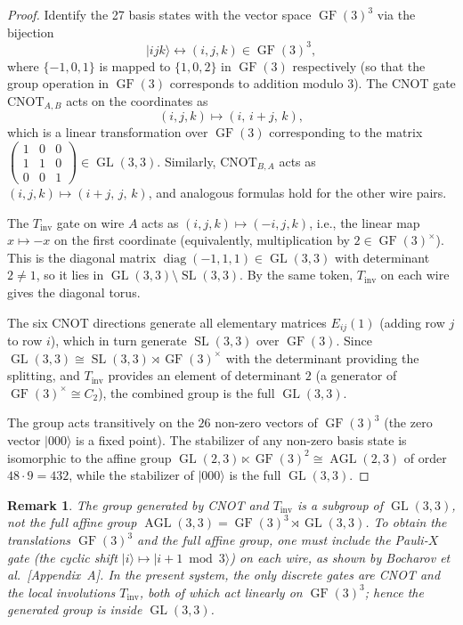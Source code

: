 \documentclass[12pt,a4paper]{article}
\newtheorem{remark}[theorem]{Remark}
\newcommand{\GL}{\operatorname{GL}}
\newcommand{\AGL}{\operatorname{AGL}}
\newcommand{\SL}{\operatorname{SL}}
\newcommand{\GF}{\operatorname{GF}}
\begin{document}
\begin{proof}
Identify the 27 basis states with the vector space $\GF(3)^3$ via the
bijection
\[
|ijk\rangle \leftrightarrow (i,j,k) \in \GF(3)^3,
\]
where $\{-1,0,1\}$ is mapped to $\{1,0,2\}$ in $\GF(3)$ respectively
(so that the group operation in $\GF(3)$ corresponds to addition modulo 3).
The CNOT gate $\text{CNOT}_{A,B}$ acts on the coordinates as
\[
(i,j,k) \mapsto (i,\, i+j,\, k),
\]
which is a linear transformation over $\GF(3)$ corresponding to the
matrix $\begin{pmatrix}1&0&0\\1&1&0\\0&0&1\end{pmatrix} \in \GL(3,3)$.
Similarly, $\text{CNOT}_{B,A}$ acts as $(i,j,k) \mapsto (i+j,\, j,\, k)$,
and analogous formulas hold for the other wire pairs.

The $T_{\text{inv}}$ gate on wire $A$ acts as $(i,j,k) \mapsto (-i, j, k)$,
i.e., the linear map $x \mapsto -x$ on the first coordinate (equivalently,
multiplication by $2 \in \GF(3)^\times$). This is the diagonal matrix
$\operatorname{diag}(-1,1,1) \in \GL(3,3)$ with determinant $2 \neq 1$,
so it lies in $\GL(3,3) \setminus \SL(3,3)$. By the same token,
$T_{\text{inv}}$ on each wire gives the diagonal torus.

The six CNOT directions generate all elementary matrices $E_{ij}(1)$
(adding row $j$ to row $i$), which in turn generate $\SL(3,3)$ over
$\GF(3)$. Since $\GL(3,3) \cong \SL(3,3) \rtimes \GF(3)^\times$ with
the determinant providing the splitting, and $T_{\text{inv}}$ provides
an element of determinant $2$ (a generator of $\GF(3)^\times \cong C_2$),
the combined group is the full $\GL(3,3)$.

The group acts transitively on the $26$ non-zero vectors of $\GF(3)^3$
(the zero vector $|000\rangle$ is a fixed point). The stabilizer of any
non-zero basis state is isomorphic to the affine group
$\GL(2,3) \ltimes \GF(3)^2 \cong \AGL(2,3)$ of order $48 \cdot 9 = 432$,
while the stabilizer of $|000\rangle$ is the full $\GL(3,3)$.
\end{proof}

\begin{remark}
The group generated by CNOT and $T_{\text{inv}}$ is a subgroup of
$\GL(3,3)$, not the full affine group $\AGL(3,3) = \GF(3)^3 \rtimes
\GL(3,3)$. To obtain the translations $\GF(3)^3$ and the full affine
group, one must include the Pauli-$X$ gate (the cyclic shift
$|i\rangle \mapsto |i+1 \bmod 3\rangle$) on each wire, as shown by
Bocharov et al.~\cite{bocharov2016improved}[Appendix~A]. In the
present system, the only discrete gates are CNOT and the local
involutions $T_{\text{inv}}$, both of which act linearly on
$\GF(3)^3$; hence the generated group is inside $\GL(3,3)$.
\end{remark}
\end{document}
